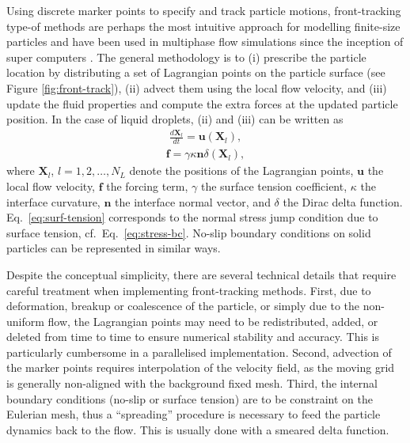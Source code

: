 Using discrete marker points to specify and track particle motions, front-tracking type-of methods are perhaps the most intuitive approach for modelling finite-size particles and have been used in multiphase flow simulations since the inception of super computers \citep{Daly1969, Viecelli_1969, Peskin, Glimm_1982, unverdi_tryggvason_1992a, tryggvason_bunner_esmaeeli_juric_al-rawahi_tauber_han_nas_jan_2001a, Pozrikidis_JCP2001, Muradoglu_Tryggvason_2014}.
The general methodology is to
(i) prescribe the particle location by distributing a set of Lagrangian points on the particle surface (see Figure \ref{fig:front-track}),
(ii) advect them using the local flow velocity, and
(iii) update the fluid properties and compute the extra forces at the updated particle position.
In the case of liquid droplets, (ii) and (iii) can be written as
\begin{equation} \label{eq:lagrangian}
 \begin{aligned}
   \frac{d \bm{X}_l}{dt} = \bm{u}(\bm{X}_l),
 \end{aligned}
\end{equation}
\begin{equation} \label{eq:surf-tension}
 \begin{aligned}
   \bm{f} = \gamma \kappa \bm{n} \delta (\bm{X}_l) ,
 \end{aligned}
\end{equation}
where $\bm{X}_l$, $l=1,2,\dots,N_L$ denote the positions of the Lagrangian points, $\bm u$ the local flow velocity, $\bm f$ the forcing term, $\gamma$ the surface tension coefficient, $\kappa$ the interface curvature, $\bm n$ the interface normal vector, and $\delta$ the Dirac delta function. Eq.\ \eqref{eq:surf-tension} corresponds to the normal stress jump condition due to surface tension, cf.\ Eq.\ \eqref{eq:stress-bc}. No-slip boundary conditions on solid particles can be represented in similar ways.

Despite the conceptual simplicity, there are several technical details that require careful treatment when implementing front-tracking methods.
First, due to deformation, breakup or coalescence of the particle, or simply due to the non-uniform flow, the Lagrangian points may need to be redistributed, added, or deleted from time to time to ensure numerical stability and accuracy.
This is particularly cumbersome in a parallelised implementation.
Second, advection of the marker points requires interpolation of the velocity field, as the moving grid is generally non-aligned with the background fixed mesh.
Third, the internal boundary conditions (no-slip or surface tension) are to be constraint on the Eulerian mesh, thus a ``spreading'' procedure is necessary to feed the particle dynamics back to the flow. This is usually done with a smeared delta function.

